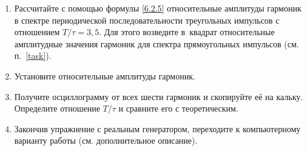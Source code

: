 \begin{lab:task}

\begin{enumerate}
	\item Рассчитайте с помощью формулы \eqref{6.2.5} относительные амплитуды гармоник в спектре периодической последовательности треугольных импульсов с отношением $T/\tau=3,5$. Для этого возведите в~квадрат относительные амплитудные значения гармоник для спектра прямоугольных импульсов (см. п.~\ref{task}).
	\item Установите относительные амплитуды гармоник.
	\item Получите осциллограмму от всех шести гармоник и скопируйте её на кальку. Определите отношение $T/\tau$ и сравните его с теоретическим.
	\item Закончив упражнение с реальным генератором, переходите к компьютерному варианту работы (см. дополнительное описание).
\end{enumerate}




\end{lab:task}
